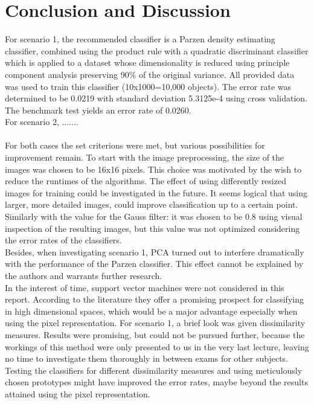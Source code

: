 \section{Conclusion and Discussion}
\label{sec:DiscConcl}

For scenario 1, the recommended classifier is a Parzen density estimating classifier, combined using the product rule with a quadratic discriminant classifier which is applied to a dataset whose dimensionality is reduced using principle component analysis preserving 90\% of the original variance. All provided data was used to train this classifier (10x1000=10,000 objects). The error rate was determined to be 0.0219 with standard deviation 5.3125e-4 using cross validation. The benchmark test yields an error rate of 0.0260.\\
For scenario 2, ....... \\
\\
\noindent For both cases the set criterions were met, but various possibilities for improvement remain. To start with the image preprocessing, the size of the images was chosen to be 16x16 pixels. This choice was motivated by the wish to reduce the runtimes of the algorithms. The effect of using differently resized images for training could be investigated in the future. It seems logical that using larger, more detailed images, could improve classification up to a certain point. Similarly with the value for the Gauss filter: it was chosen to be 0.8 using visual inspection of the resulting images, but this value was not optimized considering the error rates of the classifiers. \\
Besides, when investigating scenario 1, PCA turned out to interfere dramatically with the performance of the Parzen classifier. This effect cannot be explained by the authors and warrants further research. \\
In the interest of time, support vector machines were not considered in this report. According to the literature they offer a promising prospect for classifying in high dimensional spaces, which would be a major advantage especially when using the pixel representation. For scenario 1, a brief look was given dissimilarity measures. Results were promising, but could not be pursued further, because the workings of this method were only presented to us in the very last lecture, leaving no time to investigate them thoroughly in between exams for other subjects. Testing the classifiers for different dissimilarity measures and using meticulously chosen prototypes might have improved the error rates, maybe beyond the results attained using the pixel representation.





